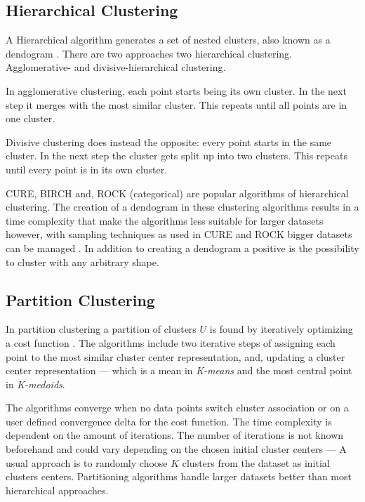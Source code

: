 \documentclass[../report.tex]{subfiles}
\begin{document}
\subsection{Hierarchical Clustering}
A Hierarchical algorithm generates a set of nested clusters, also known as a dendogram \cite{Xu2015, Jain1999}. There are two approaches two hierarchical clustering. Agglomerative- and divisive-hierarchical clustering.

In agglomerative clustering, each point starts being its own cluster. In the next step it merges with the most similar cluster. This repeats until all points are in one cluster.

Divisive clustering does instead the opposite: every point starts in the same cluster. In the next step the cluster gets split up into two clusters. This repeats until every point is in its own cluster.

CURE\cite{Jain1999}, BIRCH\cite{zhou2012ensemble} and, ROCK (categorical) \cite{Guha2000} are popular algorithms of hierarchical clustering. The creation of a dendogram in these clustering algorithms results in a time complexity that make the algorithms less suitable for larger datasets however, with sampling techniques as used in CURE and ROCK bigger datasets can be managed \cite{Xu2015,Jain1999}. In addition to creating a dendogram a positive is the possibility to cluster with any arbitrary shape. %


\subsection{Partition Clustering}
\label{sub:part}
In partition clustering a partition of clusters $U$ is found by iteratively optimizing a cost function \cite{huang2005automated, Xu2015,Jain1999}. The algorithms include two iterative steps of assigning each point to the most similar cluster center representation, and, updating a cluster center representation --- which is a mean in \textit{K-means} and the most central point in \textit{K-medoids}.

The algorithms converge when no data points switch cluster association or on a user defined convergence delta for the cost function. The time complexity is dependent on the amount of iterations. The number of iterations is not known beforehand and could vary depending on the chosen initial cluster centers --- A usual approach is to randomly choose $K$ clusters from the dataset as initial clusters centers. Partitioning algorithms handle larger datasets better than most hierarchical approaches. 
\end{document}
